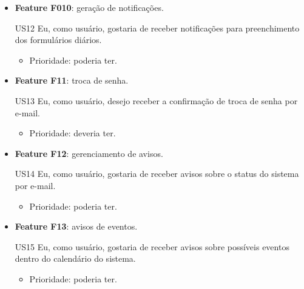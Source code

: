 \begin{itemize}
    \item \textbf{Feature F010}: geração de notificações.

    US12 Eu, como usuário, gostaria de receber notificações para preenchimento dos formulários diários.

    \begin{itemize}
        \item Prioridade: poderia ter.
    \end{itemize}
    
    \item \textbf{Feature F11}: troca de senha.

    US13 Eu, como usuário, desejo receber a confirmação de troca de senha por e-mail.

    \begin{itemize}
        \item Prioridade: deveria ter.
    \end{itemize}
    
    \item \textbf{Feature F12}: gerenciamento de avisos.

    US14 Eu, como usuário, gostaria de receber avisos sobre o status do sistema por e-mail.
    
    \begin{itemize}
        \item Prioridade: poderia ter.
    \end{itemize}
    
    \item \textbf{Feature F13}: avisos de eventos.

    US15 Eu, como usuário, gostaria de receber avisos sobre possíveis eventos dentro do calendário do sistema.
    
    \begin{itemize}
        \item Prioridade: poderia ter.
    \end{itemize}
\end{itemize}



